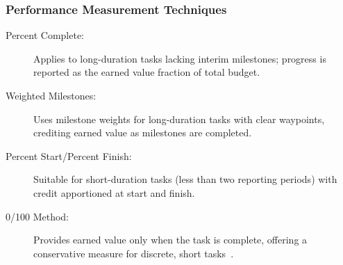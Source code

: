 \documentclass[../main.tex]{subfiles}
\begin{document}
\subsubsection{Performance Measurement Techniques}
\begin{description}
  \item[Percent Complete:] Applies to long-duration tasks lacking interim milestones; progress is reported as the earned value fraction of total budget.
  \item[Weighted Milestones:] Uses milestone weights for long-duration tasks with clear waypoints, crediting earned value as milestones are completed.
  \item[Percent Start/Percent Finish:] Suitable for short-duration tasks (less than two reporting periods) with credit apportioned at start and finish.
  \item[0/100 Method:] Provides earned value only when the task is complete, offering a conservative measure for discrete, short tasks~\autocite{edo-3-6-2-evm-analysis-2025}.
\end{description}
\end{document}

